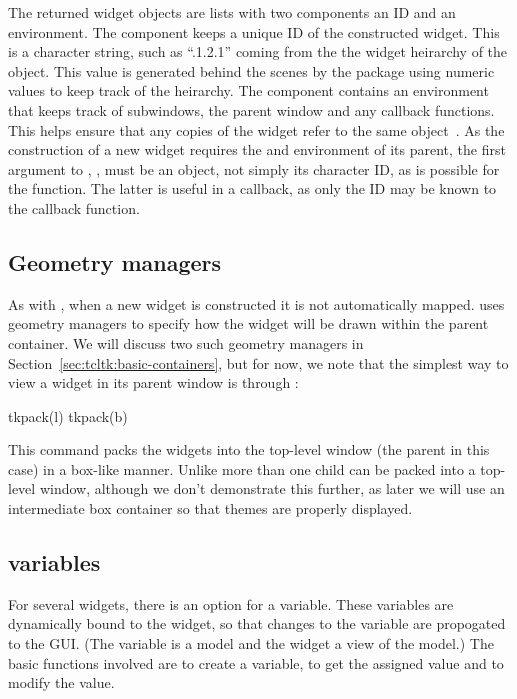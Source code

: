 The returned widget objects are lists with two components an ID and an
environment. The  component keeps a unique ID of the
constructed widget. This is a character string, such as ``.1.2.1''
coming from the the widget heirarchy of the object. This value is
generated behind the scenes by the  package using numeric
values to keep track of the heirarchy. The  component
contains an environment that keeps track of subwindows, the parent
window and any callback functions. This helps ensure that any copies
of the widget refer to the same object~\citep{Dalgaard-DSC}. As the
construction of a new widget requires the  and environment of
its parent, the first argument to , ,
must be an \R\/ \TK\/ object, not simply its character ID, as is
possible for the  function. The latter is useful in
a callback, as only the ID may be known to the callback function.


\subsection{Geometry managers}
\label{sec:tcltk:overview:geometry-managers}

As with \Qt, when a new widget is constructed it is not automatically
mapped. \TK\/ uses geometry managers to specify how the widget will be
drawn within the parent container. We will discuss two such geometry
managers in Section~\ref{sec:tcltk:basic-containers}, but for now, we note
that the simplest way to view a widget in its parent window is through
:
\begin{Schunk}
\begin{Sinput}
 tkpack(l)
 tkpack(b)
\end{Sinput}
\end{Schunk}

This command packs the widgets into the top-level window (the parent
in this case) in a box-like manner. Unlike \GTK\/ more than one child
can be packed into a top-level window, although we don't demonstrate
this further, as later we will use an intermediate 
box container so that themes are properly displayed.

\subsection{\TCL\/ variables}
\label{sec:tcltk:overview:textvariables}


For several \TK\/ widgets, there is an option  for
a \TCL\/ variable. These variables are dynamically bound to the
widget, so that changes to the variable are propogated to the
GUI. (The \TCL\/ variable is a model and the widget a view of the
model.)  The basic functions involved are  to create
a \TCL\/ variable,  to get the assigned value and
 to modify the value.

